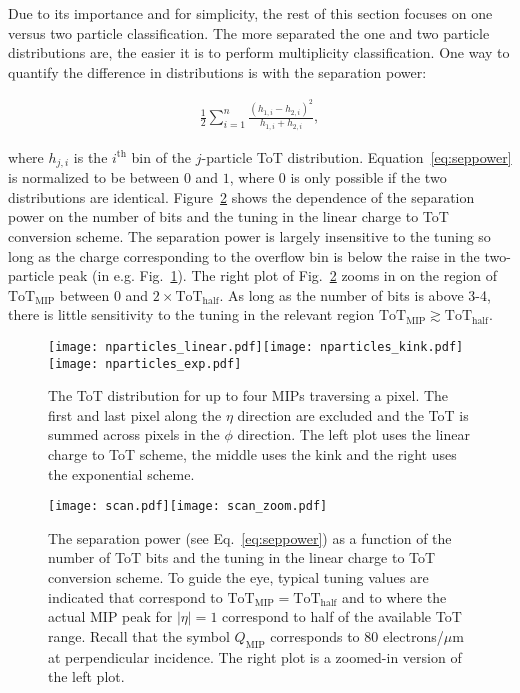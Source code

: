 \documentclass[12pt]{article}
\begin{document}
Due to its importance and for simplicity, the rest of this section focuses on one versus two particle classification.  The more separated the one and two particle distributions are, the easier it is to perform multiplicity classification.  One way to quantify the difference in distributions is with the separation power:

\begin{align}
\label{eq:seppower}
\frac{1}{2}\sum_{i=1}^n \frac{(h_{1,i}-h_{2,i})^2}{h_{1,i}+h_{2,i}},
\end{align}


\noindent where $h_{j,i}$ is the $i^\text{th}$ bin of the $j$-particle ToT distribution.  Equation~\ref{eq:seppower} is normalized to be between $0$ and $1$, where $0$ is only possible if the two distributions are identical.  Figure~\ref{fig:TwoParticleID:simple3} shows the dependence of the separation power on the number of bits and the tuning in the linear charge to ToT conversion scheme.  The separation power is largely insensitive to the tuning so long as the charge corresponding to the overflow bin is below the raise in the two-particle peak (in e.g. Fig.~\ref{fig:TwoParticleID:simple1}).  The right plot of Fig.~\ref{fig:TwoParticleID:simple3} zooms in on the region of $\text{ToT}_\text{MIP}$ between $0$ and $2\times\text{ToT}_\text{half}$.  As long as the number of bits is above 3-4, there is little sensitivity to the tuning in the relevant region $\text{ToT}_\text{MIP}\gtrsim\text{ToT}_\text{half}$.

\begin{figure}[h!]
\centering
\texttt{[image: nparticles\_linear.pdf]}\texttt{[image: nparticles\_kink.pdf]}\texttt{[image: nparticles\_exp.pdf]}
\caption{The ToT distribution for up to four MIPs traversing a pixel.  The first and last pixel along the $\eta$ direction are excluded and the ToT is summed across pixels in the $\phi$ direction. The left plot uses the linear charge to ToT scheme, the middle uses the kink and the right uses the exponential scheme.}
\label{fig:TwoParticleID:simple1}
\end{figure}

\begin{figure}[h!]
\centering
\texttt{[image: scan.pdf]}\texttt{[image: scan\_zoom.pdf]}
\caption{The separation power (see Eq.~\ref{eq:seppower}) as a function of the number of ToT bits and the tuning in the linear charge to ToT conversion scheme.  To guide the eye, typical tuning values are indicated that correspond to $\text{ToT}_\text{MIP}=\text{ToT}_\text{half}$ and to where the actual MIP peak for $|\eta|=1$ correspond to half of the available ToT range.  Recall that the symbol $Q_\text{MIP}$ corresponds to 80 electrons/$\mu$m at perpendicular incidence.  The right plot is a zoomed-in version of the left plot.}
\label{fig:TwoParticleID:simple3}
\end{figure}
\end{document}
